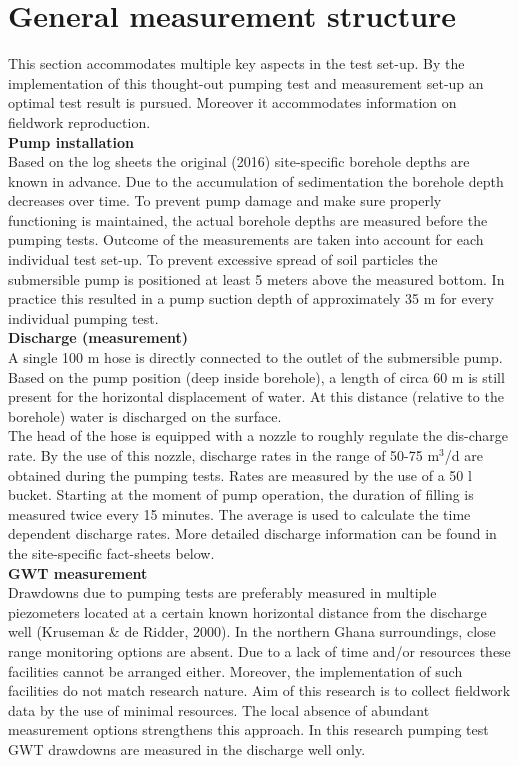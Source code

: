 \section{General measurement structure}
This section accommodates multiple key aspects in the test set-up. By the implementation of this thought-out pumping test and measurement set-up an optimal test result is pursued. Moreover it accommodates information on fieldwork reproduction.
\bigskip \\
\textbf{Pump installation} \\
Based on the log sheets the original (2016) site-specific borehole depths are known in advance. Due to the accumulation of sedimentation the borehole depth decreases over time. To prevent pump damage and make sure properly functioning is maintained, the actual borehole depths are measured before the pumping tests. Outcome of the measurements are taken into account for each individual test set-up. To prevent excessive spread of soil particles the submersible pump is positioned at least 5 meters above the measured bottom. In practice this resulted in a pump suction depth of approximately 35 m for every individual pumping test.
\bigskip \\
\textbf{Discharge (measurement)} \\
A single 100 m hose is directly connected to the outlet of the submersible pump. Based on the pump position (deep inside borehole), a length of circa 60 m is still present for the horizontal displacement of water. At this distance (relative to the borehole) water is discharged on the surface.
\\
The head of the hose is equipped with a nozzle to roughly regulate the dis-charge rate. By the use of this nozzle, discharge rates in the range of 50-75 m$^{3}$/d are obtained during the pumping tests. Rates are measured by the use of a 50 l bucket. Starting at the moment of pump operation, the duration of filling is measured twice every 15 minutes. The average is used to calculate the time dependent discharge rates. More detailed discharge information can be found in the site-specific fact-sheets below.
\bigskip \\
\textbf{GWT measurement} \\
Drawdowns due to pumping tests are preferably measured in multiple piezometers located at a certain known horizontal distance from the discharge well (Kruseman \& de Ridder, 2000). In the northern Ghana surroundings, close range monitoring options are absent. Due to a lack of time and/or resources these facilities cannot be arranged either. Moreover, the implementation of such facilities do not match research nature. Aim of this research is to collect fieldwork data by the use of minimal resources. The local absence of abundant measurement options strengthens this approach. In this research pumping test GWT drawdowns are measured in the discharge well only.\\
